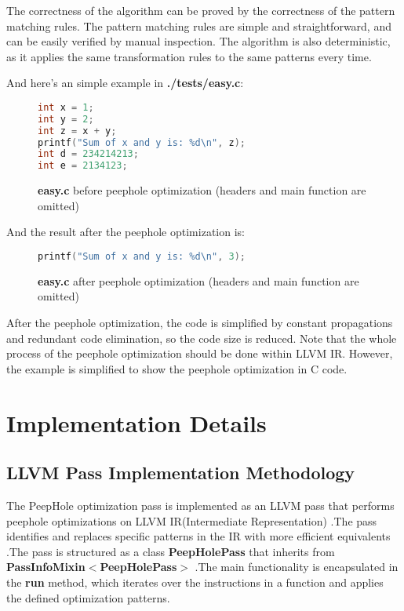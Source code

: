 \documentclass[conference]{IEEEtran}
\begin{document}
The correctness of the algorithm can be proved by the correctness of the pattern matching rules. The pattern matching rules are simple and straightforward, and can be easily verified by manual inspection. The algorithm is also deterministic, as it applies the same transformation rules to the same patterns every time.

And here's an simple example in \textbf{./tests/easy.c}:

\begin{figure}[H]
	\begin{lstlisting}[language=C, frame=single, showstringspaces=false]
int x = 1;
int y = 2;
int z = x + y;
printf("Sum of x and y is: %d\n", z);
int d = 234214213;
int e = 2134123;
    \end{lstlisting}
	\caption{\textbf{easy.c} before peephole optimization (headers and main function are omitted)}
\end{figure}

And the result after the peephole optimization is:

\begin{figure}[H]
	\begin{lstlisting}[language=C, frame=single, showstringspaces=false]
printf("Sum of x and y is: %d\n", 3);
    \end{lstlisting}
	\caption{\textbf{easy.c} after peephole optimization (headers and main function are omitted)}
\end{figure}

After the peephole optimization, the code is simplified by constant propagations and redundant code elimination, so the code size is reduced. Note that the whole process of the peephole optimization should be done within LLVM IR. However, the example is simplified to show the peephole optimization in C code.

\section{Implementation Details}

\subsection{LLVM Pass Implementation Methodology}

The PeepHole optimization pass is implemented as an
LLVM pass that performs peephole optimizations on LLVM
IR(Intermediate Representation)
.The pass identifies and replaces specific patterns in the IR with more
efficient equivalents
.The pass is structured as a
class \textbf{PeepHolePass} that inherits from \textbf{
	PassInfoMixin$<$PeepHolePass$>$}
.The main functionality is encapsulated in the \textbf{run} method,
which iterates over the instructions in a function and applies the defined
optimization patterns.
\end{document}
